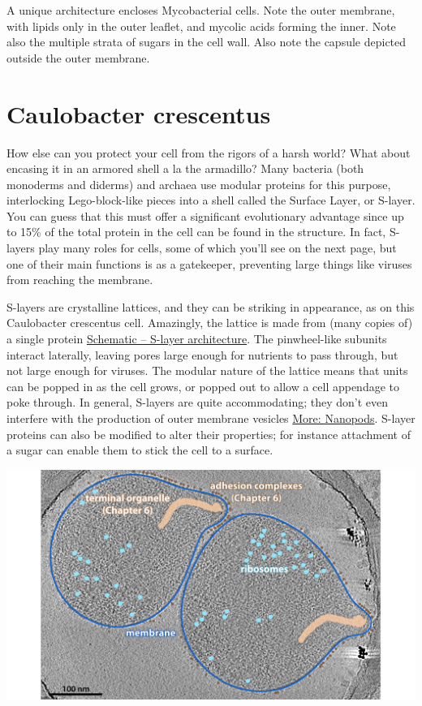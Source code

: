 \documentclass[]{tufte-book}
\begin{document}
A unique architecture encloses Mycobacterial cells. Note the outer
membrane, with lipids only in the outer leaflet, and mycolic acids
forming the inner. Note also the multiple strata of sugars in the cell
wall. Also note the capsule depicted outside the outer membrane.

\section{Caulobacter crescentus}\label{caulobacter-crescentus}

How else can you protect your cell from the rigors of a harsh world?
What about encasing it in an armored shell a la the armadillo? Many
bacteria (both monoderms and diderms) and archaea use modular proteins
for this purpose, interlocking Lego-block-like pieces into a shell
called the Surface Layer, or S-layer. You can guess that this must offer
a significant evolutionary advantage since up to 15\% of the total
protein in the cell can be found in the structure. In fact, S-layers
play many roles for cells, some of which you'll see on the next page,
but one of their main functions is as a gatekeeper, preventing large
things like viruses from reaching the membrane.

S-layers are crystalline lattices, and they can be striking in
appearance, as on this Caulobacter crescentus cell. Amazingly, the
lattice is made from (many copies of) a single protein
\protect\hyperlink{fig:2-6-1}{Schematic -- S-layer architecture}. The
pinwheel-like subunits interact laterally, leaving pores large enough
for nutrients to pass through, but not large enough for viruses. The
modular nature of the lattice means that units can be popped in as the
cell grows, or popped out to allow a cell appendage to poke through. In
general, S-layers are quite accommodating; they don't even interfere
with the production of outer membrane vesicles
\protect\hyperlink{Nanopods}{More: Nanopods}. S-layer proteins can also
be modified to alter their properties; for instance attachment of a
sugar can enable them to stick the cell to a surface.

\includegraphics{img/02_static/2_1_Mgenitalium}
\end{document}
